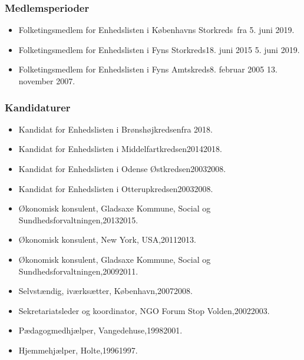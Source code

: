 \documentclass[11pt, a4paper]{awesome-cv}
\begin{document}
\begin{cvletter}
\subsubsection*{Medlemsperioder}
\begin{itemize}
\item Folketingsmedlem for Enhedslisten i Københavns Storkreds fra 5. juni 2019.
\item Folketingsmedlem for Enhedslisten i Fyns Storkreds18. juni 2015  5. juni 2019.
\item Folketingsmedlem for Enhedslisten i Fyns Amtskreds8. februar 2005  13. november 2007.
\end{itemize}
\subsubsection*{Kandidaturer}
\begin{itemize}
\item Kandidat for Enhedslisten i Brønshøjkredsenfra 2018.
\item Kandidat for Enhedslisten i Middelfartkredsen20142018.
\item Kandidat for Enhedslisten i Odense Østkredsen20032008.
\item Kandidat for Enhedslisten i Otterupkredsen20032008.
\end{itemize}
\begin{itemize}
\item Økonomisk konsulent, Gladsaxe Kommune, Social og Sundhedsforvaltningen,20132015.
\item Økonomisk konsulent, New York, USA,20112013.
\item Økonomisk konsulent, Gladsaxe Kommune, Social og Sundhedsforvaltningen,20092011.
\item Selvstændig, iværksætter, København,20072008.
\item Sekretariatsleder og koordinator, NGO Forum  Stop Volden,20022003.
\item Pædagogmedhjælper, Vangedehuse,19982001.
\item Hjemmehjælper, Holte,19961997.
\end{itemize}
\end{cvletter}
\end{document}
